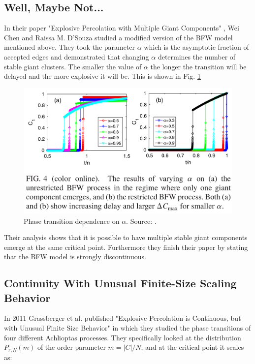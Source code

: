 \subsection{Well, Maybe Not...}
In their paper "Explosive Percolation with Multiple Giant Components" \cite{Chen_1}, Wei Chen and Raissa M. D’Souza studied a modified version of the BFW model mentioned above.
They took the parameter $\alpha$ which is the asymptotic fraction of accepted edges and demonstrated that changing $\alpha$ determines the number of stable giant clusters.
The smaller the value of $\alpha$ the longer the transition will be delayed and the more explosive it will be.
This is shown in Fig. \ref{fig:bfw_alpha_comparison}

\begin{figure}[H]
	\centering
	\includegraphics[width=350pt]{images/bfw_alpha_comparison.png}
	\caption{Phase transition dependence on $\alpha$. Source: \cite{Chen_1}.}
	\label{fig:bfw_alpha_comparison}
\end{figure}

Their analysis shows that it is possible to have multiple stable giant components emerge at the same critical point.
Furthermore they finish their paper by stating that the BFW model is strongly discontinuous.



\subsection{Continuity With Unusual Finite-Size Scaling Behavior}
In 2011 Grassberger et al. published "Explosive Percolation is Continuous, but with Unusual Finite Size Behavior" \cite{Grassberger_1} in which they studied the phase transitions of four different Achlioptas processes.
They specifically looked at the distribution $P_{r, N}(m)$ of the order parameter $m = |C| / N$, and at the critical point it scales as:

